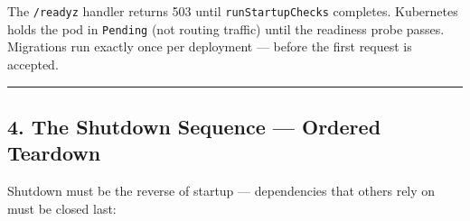 \documentclass[
]{article}
\begin{document}
The \texttt{/readyz} handler returns 503 until \texttt{runStartupChecks}
completes. Kubernetes holds the pod in \texttt{Pending} (not routing
traffic) until the readiness probe passes. Migrations run exactly once
per deployment --- before the first request is accepted.

\begin{center}\rule{0.5\linewidth}{0.5pt}\end{center}

\hypertarget{the-shutdown-sequence-ordered-teardown}{%
\subsection{4. The Shutdown Sequence --- Ordered
Teardown}\label{the-shutdown-sequence-ordered-teardown}}

Shutdown must be the reverse of startup --- dependencies that others
rely on must be closed last:
\end{document}
